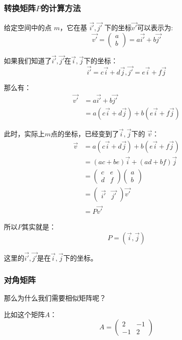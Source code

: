 \documentclass[12pt]{article}
\begin{document}
\subsubsection{转换矩阵$P$的计算方法}
给定空间中的点 $m$，它在基 $\vec{i'},\vec{j'}$ 下的坐标$\vec{v'}$可以表示为:
$$
\vec{v'} = \begin{pmatrix}a\\b\end{pmatrix} = a\vec{i'} + b\vec{j'}
$$

如果我们知道了$\vec{i'},\vec{j'}$在$\vec{i},\vec{j}$下的坐标：
$$
\vec{i'} = c\vec{i} + d\vec{j}, \vec{j'} = e\vec{i} + f\vec{j}
$$

那么有：
\begin{align*}
\vec{v'} &= a\vec{i'} + b\vec{j'} \\
    &= a(c\vec{i} + d\vec{j}) + b(e\vec{i} + f\vec{j})
\end{align*}

此时，实际上$m$点的坐标，已经变到了$\vec{i},\vec{j}$下的 $\vec{v}$：
\begin{align*}
\vec{v} &= a(c\vec{i} + d\vec{j}) + b(e\vec{i} + f\vec{j}) \\
    &= (ac+be)\vec{i} + (ad+bf)\vec{j} \\
    &= \begin{pmatrix}c&e\\d&f\end{pmatrix}\begin{pmatrix}a\\b\end{pmatrix} \\
    &= \begin{pmatrix}\vec{i'}&\vec{j'}\end{pmatrix}\vec{v'} \\
    &= P\vec{v'}
\end{align*}

所以$P$其实就是：
$$
P = (\vec{i}, \vec{j})
$$

这里的$\vec{i'},\vec{j'}$是在$\vec{i},\vec{j}$下的坐标。

\subsubsection{对角矩阵}
那么为什么我们需要相似矩阵呢？

比如这个矩阵$A$：
$$
A = \begin{pmatrix}2&-1\\-1&2\end{pmatrix}
$$
\end{document}
